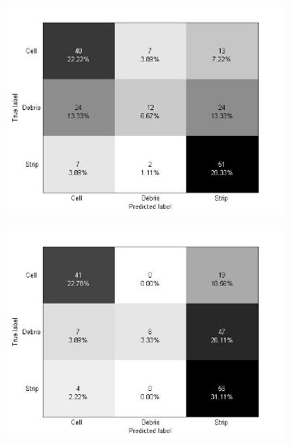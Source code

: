\begin{figure}[!h]
\begin{subfigure}[b]{0.3\textwidth}
    \caption{}
  \end{subfigure}
  \begin{subfigure}[b]{0.3\textwidth}
    \includegraphics[width=\textwidth]{confusion_matrix/fig3_3c.jpg}
    \caption{}
  \end{subfigure}
  \begin{subfigure}[b]{0.3\textwidth}
    \includegraphics[width=\textwidth]{confusion_matrix/fig3_3d.jpg}
    \caption{}
  \end{subfigure}
  \begin{subfigure}[b]{0.3\textwidth}

\end{subfigure}
\end{figure}
